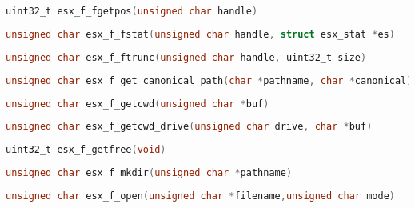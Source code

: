 \documentclass[11pt]{book}
\def\lthtmlcheckvsize{\ifdim\ht\sizebox<\vsize 
  \ifdim\wd\sizebox<\hsize\expandafter\hfill\fi \expandafter\vfill
  \else\expandafter\vss\fi}%
\begin{document}
{\newpage\clearpage
{}%
\begin{lstlisting}[language=C]
uint32_t esx_f_fgetpos(unsigned char handle)
\end{lstlisting}%
\lthtmlfigureZ
\lthtmlcheckvsize\clearpage}

{\newpage\clearpage
{}%
\begin{lstlisting}[language=C]
unsigned char esx_f_fstat(unsigned char handle, struct esx_stat *es)
\end{lstlisting}%
\lthtmlfigureZ
\lthtmlcheckvsize\clearpage}

{\newpage\clearpage
{}%
\begin{lstlisting}[language=C]
unsigned char esx_f_ftrunc(unsigned char handle, uint32_t size)
\end{lstlisting}%
\lthtmlfigureZ
\lthtmlcheckvsize\clearpage}

{\newpage\clearpage
{}%
\begin{lstlisting}[language=C]
unsigned char esx_f_get_canonical_path(char *pathname, char *canonical)
\end{lstlisting}%
\lthtmlfigureZ
\lthtmlcheckvsize\clearpage}

{\newpage\clearpage
{}%
\begin{lstlisting}[language=C]
unsigned char esx_f_getcwd(unsigned char *buf)
\end{lstlisting}%
\lthtmlfigureZ
\lthtmlcheckvsize\clearpage}

{\newpage\clearpage
{}%
\begin{lstlisting}[language=C]
unsigned char esx_f_getcwd_drive(unsigned char drive, char *buf)
\end{lstlisting}%
\lthtmlfigureZ
\lthtmlcheckvsize\clearpage}

{\newpage\clearpage
{}%
\begin{lstlisting}[language=C]
uint32_t esx_f_getfree(void)
\end{lstlisting}%
\lthtmlfigureZ
\lthtmlcheckvsize\clearpage}

{\newpage\clearpage
{}%
\begin{lstlisting}[language=C]
unsigned char esx_f_mkdir(unsigned char *pathname)
\end{lstlisting}%
\lthtmlfigureZ
\lthtmlcheckvsize\clearpage}

{\newpage\clearpage
{}%
\begin{lstlisting}[language=C]
unsigned char esx_f_open(unsigned char *filename,unsigned char mode)
\end{lstlisting}%
\lthtmlfigureZ
\lthtmlcheckvsize\clearpage}
\end{document}
